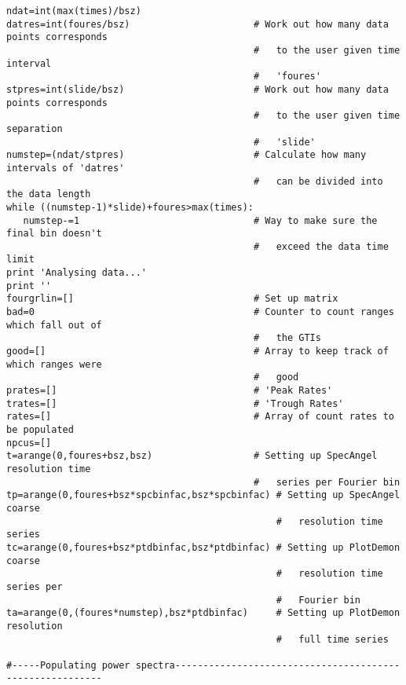 \begin{verbatim}
ndat=int(max(times)/bsz)
datres=int(foures/bsz)                      # Work out how many data points corresponds
                                            #   to the user given time interval
                                            #   'foures'
stpres=int(slide/bsz)                       # Work out how many data points corresponds
                                            #   to the user given time separation
                                            #   'slide'
numstep=(ndat/stpres)                       # Calculate how many intervals of 'datres'
                                            #   can be divided into the data length
while ((numstep-1)*slide)+foures>max(times):
   numstep-=1                               # Way to make sure the final bin doesn't
                                            #   exceed the data time limit
print 'Analysing data...'
print ''
fourgrlin=[]                                # Set up matrix
bad=0                                       # Counter to count ranges which fall out of
                                            #   the GTIs
good=[]                                     # Array to keep track of which ranges were
                                            #   good
prates=[]                                   # 'Peak Rates'
trates=[]                                   # 'Trough Rates'
rates=[]                                    # Array of count rates to be populated
npcus=[]                                                                 
t=arange(0,foures+bsz,bsz)                  # Setting up SpecAngel resolution time
                                            #   series per Fourier bin
tp=arange(0,foures+bsz*spcbinfac,bsz*spcbinfac) # Setting up SpecAngel coarse
                                                #   resolution time series
tc=arange(0,foures+bsz*ptdbinfac,bsz*ptdbinfac) # Setting up PlotDemon coarse
                                                #   resolution time series per
                                                #   Fourier bin
ta=arange(0,(foures*numstep),bsz*ptdbinfac)     # Setting up PlotDemon resolution
                                                #   full time series

#-----Populating power spectra---------------------------------------------------------


\end{verbatim}
